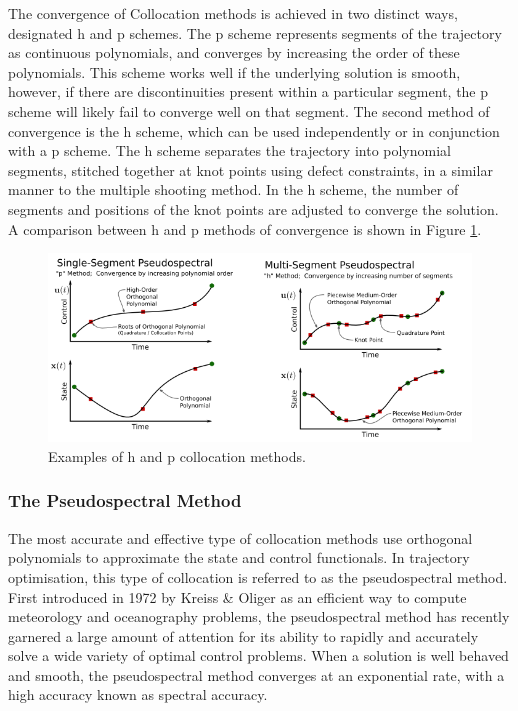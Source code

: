 The convergence of Collocation methods is achieved in two distinct ways, designated \textsf{h} and \textsf{p} schemes\cite{Kelly2015}. The \textsf{p} scheme represents segments of the trajectory as continuous polynomials, and converges by increasing the order of these polynomials\cite{Kelly2015}. This scheme works well if the underlying solution is smooth, however, if there are discontinuities present within a particular segment, the \textsf{p} scheme will likely fail to converge well on that segment\cite{Kelly2015}. The second method of convergence is the \textsf{h} scheme, which can be used independently or in conjunction with a \textsf{p} scheme. The \textsf{h} scheme separates the trajectory into polynomial segments, stitched together at knot points using defect constraints, in a similar manner to the multiple shooting method\cite{Kelly2015,Rao2009,Ross2004}. In the \textsf{h} scheme, the number of segments and positions of the knot points are adjusted to converge the solution. A comparison between \textsf{h} and \textsf{p} methods of convergence is shown in Figure \ref{fig:HPExamples}.
\begin{figure}[ht]
	\centering
	\includegraphics[width=0.9\linewidth]{figures/2_literature-review/HPExamples}
	\caption{Examples of \textsf{h} and \textsf{p} collocation methods\cite{Kelly2015}.}
	\label{fig:HPExamples}
\end{figure}

\subsubsection{The Pseudospectral Method}\label{sec:PS}


The most accurate and effective type of collocation methods use orthogonal polynomials to approximate the state and control functionals\cite{Fahroo2000}. In trajectory optimisation, this type of collocation is referred to as the pseudospectral method\cite{Kelly2015}. 
First introduced in 1972 by Kreiss \& Oliger\cite{Kreiss1972} as an efficient way to compute meteorology and oceanography problems, the pseudospectral method has recently garnered a large amount of attention for its ability to rapidly and accurately solve a wide variety of optimal control problems.  When a solution is well behaved and smooth, the pseudospectral method converges at an exponential rate, with a high accuracy known as spectral accuracy\cite{Ross2004,Darby2011a}. 

